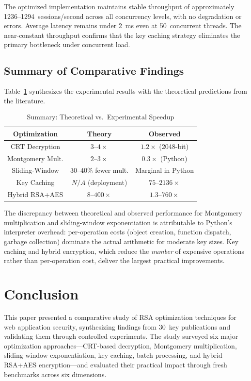 \documentclass[journal]{IEEEtran}
\begin{document}
The optimized implementation maintains stable throughput of approximately 1236--1294~sessions/second across all concurrency levels, with no degradation or errors. Average latency remains under 2~ms even at 50~concurrent threads. The near-constant throughput confirms that the key caching strategy eliminates the primary bottleneck under concurrent load.

\subsection{Summary of Comparative Findings}

Table~\ref{tab:summary} synthesizes the experimental results with the theoretical predictions from the literature.

\begin{table}[!t]
\caption{Summary: Theoretical vs.\ Experimental Speedup}
\label{tab:summary}
\centering
\begin{tabular}{|c|c|c|}
\hline
\textbf{Optimization} & \textbf{Theory} & \textbf{Observed} \\
\hline
CRT Decryption & $3$--$4\times$ & $1.2\times$ (2048-bit) \\
\hline
Montgomery Mult. & $2$--$3\times$ & $0.3\times$ (Python) \\
\hline
Sliding-Window & $30$--$40\%$ fewer mult. & Marginal in Python \\
\hline
Key Caching & $N/A$ (deployment) & $75$--$2136\times$ \\
\hline
Hybrid RSA+AES & $8$--$400\times$ & $1.3$--$760\times$ \\
\hline
\end{tabular}
\end{table}

The discrepancy between theoretical and observed performance for Montgomery multiplication and sliding-window exponentiation is attributable to Python's interpreter overhead: per-operation costs (object creation, function dispatch, garbage collection) dominate the actual arithmetic for moderate key sizes. Key caching and hybrid encryption, which reduce the \textit{number} of expensive operations rather than per-operation cost, deliver the largest practical improvements.


\section{Conclusion}
\label{sec:conclusion}

This paper presented a comparative study of RSA optimization techniques for web application security, synthesizing findings from 30~key publications and validating them through controlled experiments. The study surveyed six major optimization approaches---CRT-based decryption, Montgomery multiplication, sliding-window exponentiation, key caching, batch processing, and hybrid RSA+AES encryption---and evaluated their practical impact through fresh benchmarks across six dimensions.
\end{document}
